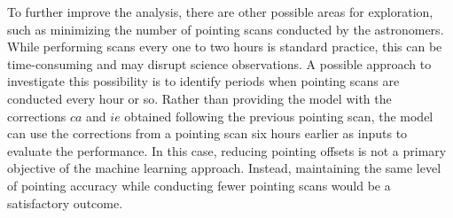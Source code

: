 To further improve the analysis, there are other possible areas for exploration, such as minimizing the number of pointing scans conducted by the astronomers.
While performing scans every one to two hours is standard practice, this can be time-consuming and may disrupt science observations.
A possible approach to investigate this possibility is to identify periods when pointing scans are conducted every hour or so.
Rather than providing the model with the corrections $ca$ and $ie$ obtained following the previous pointing scan,
the model can use the corrections from a pointing scan six hours earlier as inputs to evaluate the performance.
In this case, reducing pointing offsets is not a primary objective of the machine learning approach.
Instead, maintaining the same level of pointing accuracy while conducting fewer pointing scans would be a satisfactory outcome.\\




